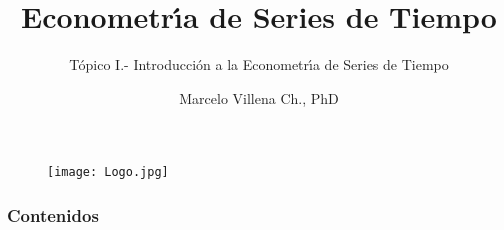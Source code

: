 \documentclass[xcolor=(list of options)]{beamer}
\title[ECO -TS101]{Econometr\'\i{}a de Series de Tiempo}
\subtitle{T\'opico I.- Introducci\'on a la Econometr\'\i{}a de Series de Tiempo}
\author{Marcelo Villena Ch., PhD}
\institute[UAI] %
{
Universidad Adolfo Ib\'a\~nez 
 \\ %
\medskip
}
\date{} %
\begin{document}
\begin{frame}

\begin{figure}[t!]
\texttt{[image: Logo.jpg]}
\end{figure}
\titlepage %
\end{frame}

\begin{frame}
\frametitle{Contenidos} 
\tableofcontents %
\end{frame}



\end{document}
